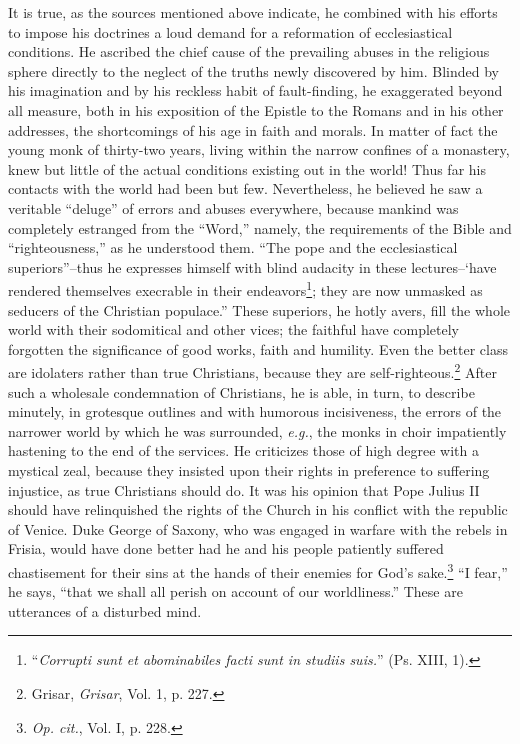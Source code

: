 It is true, as the sources mentioned above indicate, he combined
with his efforts to impose his doctrines a loud demand for a reformation
of ecclesiastical conditions. He ascribed the chief cause
of the prevailing abuses in the religious sphere directly to the neglect
of the truths newly discovered by him. Blinded by his imagination
and by his reckless habit of fault-finding, he exaggerated beyond
all measure, both in his exposition of the Epistle to the Romans and
in his other addresses, the shortcomings of his age in faith and morals.
In matter of fact the young monk of thirty-two years, living within
the narrow confines of a monastery, knew but little of the actual
conditions existing out in the world! Thus far his contacts with
the world had been but few. Nevertheless, he believed he saw a
veritable “deluge” of errors and abuses everywhere, because mankind
was completely estranged from the “Word,” namely, the requirements
of the Bible and “righteousness,” as he understood them.
“The pope and the ecclesiastical superiors”--thus he expresses himself
with blind audacity in these lectures--‘have rendered themselves execrable
in their endeavors\footnote{“\textit{Corrupti sunt et abominabiles facti sunt in studiis suis.}” (Ps. XIII, 1).};
they are now unmasked as seducers of the Christian populace.” These superiors, he hotly avers,
fill the whole world with their sodomitical and other vices; the faithful
have completely forgotten the significance of good works, faith
and humility. Even the better class are idolaters rather than true
Christians, because they are self-righteous.\footnote{Grisar, \textit{Grisar}, Vol. 1, p. 227.}
After such a wholesale condemnation of Christians, he is able, in turn, to describe
minutely, in grotesque outlines and with humorous incisiveness, the
errors of the narrower world by which he was surrounded, \textit{e.g.},
the monks in choir impatiently hastening to the end of the services.
He criticizes those of high degree with a mystical zeal, because they
insisted upon their rights in preference to suffering injustice, as
true Christians should do. It was his opinion that Pope Julius II
should have relinquished the rights of the Church in his conflict
with the republic of Venice. Duke George of Saxony, who was engaged in
warfare with the rebels in Frisia, would have done better
had he and his people patiently suffered chastisement for their sins
at the hands of their enemies for God’s sake.\footnote{\textit{Op. cit.}, Vol. I, p. 228.}
“I fear,” he says,
“that we shall all perish on account of our worldliness.” These are
utterances of a disturbed mind.

